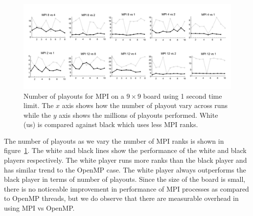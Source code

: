 \documentclass[nocopyrightspace, 10pt]{sigplanconf}
\begin{document}
%  
%  

\begin{figure}
\centering
\includegraphics[width=\textwidth]{war_MPI_vs.pdf}
\caption{Number of playouts for MPI on a $9\times 9$ board using 1 second time limit. The $x$ axis shows how the number of playout vary across runs while the $y$ axis shows the millions of playouts performed. White (us) is compared against black which uses less MPI ranks.}
\label{fig:playoutmpi}
\end{figure}

The number of playouts as we vary the number of MPI ranks is shown in figure~\ref{fig:playoutmpi}. The white and black lines show the performance of the white and black players respectively. The white player runs more ranks than the black player and has similar trend to the OpenMP case. The white player always outperforms the black player in terms of number of playouts. Since the size of the board is small, there is no noticeable improvement in performance of MPI processes as compared to OpenMP threads, but we do observe that there are measurable overhead in using MPI vs OpenMP.
\end{document}
